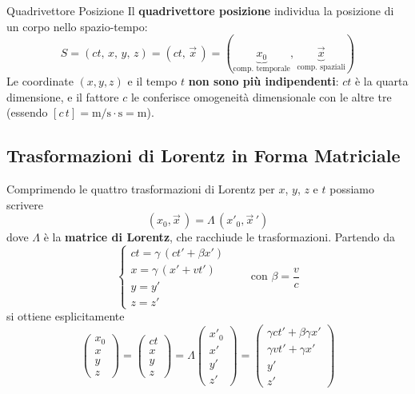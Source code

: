 \begin{definizione}{Quadrivettore Posizione}
Il \textbf{quadrivettore posizione} individua la posizione di un corpo nello spazio-tempo:
\begin{equation}
    S = (ct,\, x,\, y,\, z) = (ct,\, \vec{x}\,) = (\underbrace{x_0}_{\text{comp. temporale}},\, \underbrace{\vec{x}}_{\text{comp. spaziali}})
\end{equation}
Le coordinate $(x,y,z)$ e il tempo $t$ \textbf{non sono più indipendenti}: $ct$ è la quarta dimensione, e il fattore $c$ le conferisce omogeneità dimensionale con le altre tre (essendo $[c\,t] = \mathrm{m/s} \cdot \mathrm{s} = \mathrm{m}$).
\end{definizione}

\subsection{Trasformazioni di Lorentz in Forma Matriciale}

Comprimendo le quattro trasformazioni di Lorentz per $x$, $y$, $z$ e $t$ possiamo scrivere
\begin{equation}
    (x_0, \vec{x}\,) = \Lambda \, (x'_0, \vec{x}\,')
\end{equation}
dove $\Lambda$ è la \textbf{matrice di Lorentz}, che racchiude le trasformazioni. Partendo da
\begin{equation*}
    \begin{cases}
        ct = \gamma\,(ct' + \beta x') \\
        x = \gamma\,(x' + vt') \\
        y = y' \\
        z = z'
    \end{cases}
    \qquad \text{con } \beta = \frac{v}{c}
\end{equation*}
si ottiene esplicitamente
\begin{equation}
    \begin{pmatrix} x_0 \\ x \\ y \\ z \end{pmatrix}
    =
    \begin{pmatrix} ct \\ x \\ y \\ z \end{pmatrix}
    = \Lambda
    \begin{pmatrix} x'_0 \\ x' \\ y' \\ z' \end{pmatrix}
    =
    \begin{pmatrix}
        \gamma c t' + \beta\gamma x' \\
        \gamma v t' + \gamma x' \\
        y' \\ z'
    \end{pmatrix}
\end{equation}

